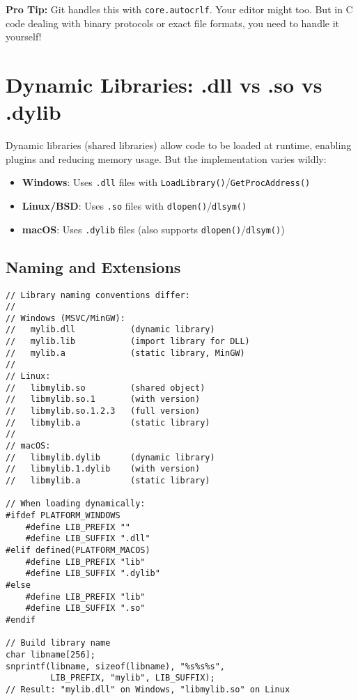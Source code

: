 \begin{tipbox}
\textbf{Pro Tip:} Git handles this with \texttt{core.autocrlf}. Your editor might too. But in C code dealing with binary protocols or exact file formats, you need to handle it yourself!
\end{tipbox}

\section{Dynamic Libraries: .dll vs .so vs .dylib}

Dynamic libraries (shared libraries) allow code to be loaded at runtime, enabling plugins and reducing memory usage. But the implementation varies wildly:

\begin{itemize}
    \item \textbf{Windows}: Uses \texttt{.dll} files with \texttt{LoadLibrary()}/\texttt{GetProcAddress()}
    \item \textbf{Linux/BSD}: Uses \texttt{.so} files with \texttt{dlopen()}/\texttt{dlsym()}
    \item \textbf{macOS}: Uses \texttt{.dylib} files (also supports \texttt{dlopen()}/\texttt{dlsym()})
\end{itemize}

\subsection{Naming and Extensions}

\begin{lstlisting}
// Library naming conventions differ:
//
// Windows (MSVC/MinGW):
//   mylib.dll           (dynamic library)
//   mylib.lib           (import library for DLL)
//   mylib.a             (static library, MinGW)
//
// Linux:
//   libmylib.so         (shared object)
//   libmylib.so.1       (with version)
//   libmylib.so.1.2.3   (full version)
//   libmylib.a          (static library)
//
// macOS:
//   libmylib.dylib      (dynamic library)
//   libmylib.1.dylib    (with version)
//   libmylib.a          (static library)

// When loading dynamically:
#ifdef PLATFORM_WINDOWS
    #define LIB_PREFIX ""
    #define LIB_SUFFIX ".dll"
#elif defined(PLATFORM_MACOS)
    #define LIB_PREFIX "lib"
    #define LIB_SUFFIX ".dylib"
#else
    #define LIB_PREFIX "lib"
    #define LIB_SUFFIX ".so"
#endif

// Build library name
char libname[256];
snprintf(libname, sizeof(libname), "%s%s%s",
         LIB_PREFIX, "mylib", LIB_SUFFIX);
// Result: "mylib.dll" on Windows, "libmylib.so" on Linux
\end{lstlisting}

